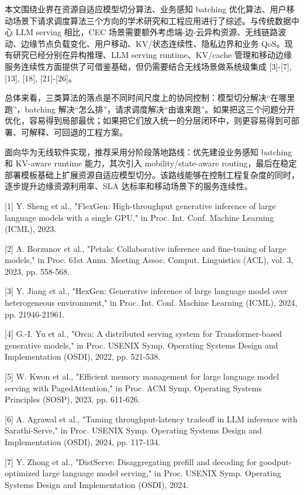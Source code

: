 \documentclass[a4paper,twocolumn,10pt]{ctexart}
\begin{document}
本文围绕业界在资源自适应模型切分算法、业务感知 batching 优化算法、用户移动场景下请求调度算法三个方向的学术研究和工程应用进行了综述。与传统数据中心 LLM serving 相比，CEC 场景需要额外考虑端-边-云异构资源、无线链路波动、边缘节点负载变化、用户移动、KV/状态连续性、隐私边界和业务 QoS。现有研究已经分别在异构推理、LLM serving runtime、KV/cache 管理和移动边缘服务连续性方面提供了可借鉴基础，但仍需要结合无线场景做系统级集成 [3]-[7], [13], [18], [21]-[26]。


总体来看，三类算法的落点是不同时间尺度上的协同控制：模型切分解决“在哪里跑”，batching 解决“怎么排”，请求调度解决“由谁来跑”。如果把这三个问题分开优化，容易得到局部最优；如果把它们放入统一的分层闭环中，则更容易得到可部署、可解释、可回退的工程方案。


面向华为无线软件实现，推荐采用分阶段落地路线：优先建设业务感知 batching 和 KV-aware runtime 能力，其次引入 mobility/state-aware routing，最后在稳定部署模板基础上扩展资源自适应模型切分。该路线能够在控制工程复杂度的同时，逐步提升边缘资源利用率、SLA 达标率和移动场景下的服务连续性。




[1] Y. Sheng et al., "FlexGen: High-throughput generative inference of large language models with a single GPU," in Proc. Int. Conf. Machine Learning (ICML), 2023.


[2] A. Borzunov et al., "Petals: Collaborative inference and fine-tuning of large models," in Proc. 61st Annu. Meeting Assoc. Comput. Linguistics (ACL), vol. 3, 2023, pp. 558-568.


[3] Y. Jiang et al., "HexGen: Generative inference of large language model over heterogeneous environment," in Proc. Int. Conf. Machine Learning (ICML), 2024, pp. 21946-21961.


[4] G.-I. Yu et al., "Orca: A distributed serving system for Transformer-based generative models," in Proc. USENIX Symp. Operating Systems Design and Implementation (OSDI), 2022, pp. 521-538.


[5] W. Kwon et al., "Efficient memory management for large language model serving with PagedAttention," in Proc. ACM Symp. Operating Systems Principles (SOSP), 2023, pp. 611-626.


[6] A. Agrawal et al., "Taming throughput-latency tradeoff in LLM inference with Sarathi-Serve," in Proc. USENIX Symp. Operating Systems Design and Implementation (OSDI), 2024, pp. 117-134.


[7] Y. Zhong et al., "DistServe: Disaggregating prefill and decoding for goodput-optimized large language model serving," in Proc. USENIX Symp. Operating Systems Design and Implementation (OSDI), 2024.
\end{document}
